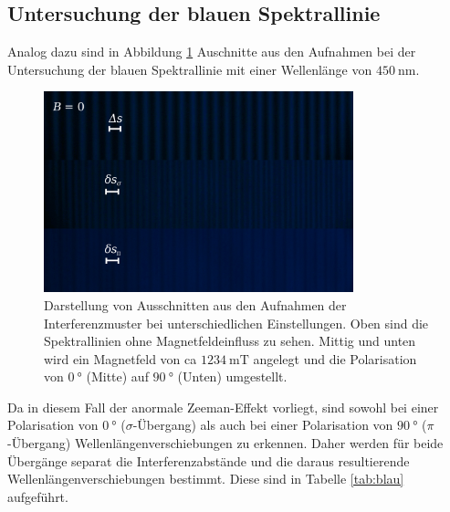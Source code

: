  \subsection{Untersuchung der blauen Spektrallinie}
 Analog dazu sind in Abbildung \ref{fig:blau} Auschnitte aus den Aufnahmen bei der Untersuchung der blauen 
 Spektrallinie mit einer Wellenlänge von $\SI{450}{\nano\meter}$. 
 \begin{figure}[H]
     \centering
     \includegraphics[width=0.8\textwidth]{../images/zebraplot_blau.jpg}
     \caption{Darstellung von Ausschnitten aus den Aufnahmen der Interferenzmuster bei unterschiedlichen 
     Einstellungen. Oben sind die Spektrallinien ohne Magnetfeldeinfluss zu sehen. Mittig und unten 
     wird ein Magnetfeld von ca $\SI{1234}{\milli\tesla}$ angelegt und die Polarisation von $\SI{0}{\degree}$ (Mitte)
     auf $\SI{90}{\degree}$ (Unten) umgestellt.}
     \label{fig:blau}
 \end{figure} \noindent
 Da in diesem Fall der anormale Zeeman-Effekt vorliegt, sind sowohl bei einer Polarisation von 
 $\SI{0}{\degree}$ ($\sigma$-Übergang) als auch bei einer Polarisation von $\SI{90}{\degree}$ ($\pi$-Übergang)
 Wellenlängenverschiebungen zu erkennen. Daher werden für beide Übergänge separat die Interferenzabstände 
 und die daraus resultierende Wellenlängenverschiebungen bestimmt. Diese sind in Tabelle \ref{tab:blau} 
 aufgeführt. 
